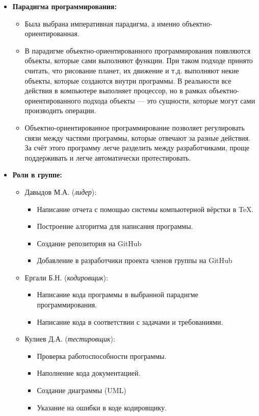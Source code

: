 \documentclass[14pt, oneside]{altsu-report}
\begin{document}
\begin{itemize}
    \item \textbf{Парадигма программирования:}
    \begin{itemize}
     \item Была выбрана императивная парадигма, а именно объектно-ориентированная.
     \item В парадигме объектно-ориентированного программирования появляются объекты, которые сами выполняют функции. При таком подходе принято считать, что рисование планет, их движение и т.д. выполняют некие объекты, которые создаются внутри программы. В реальности все действия в компьютере выполняет процессор, но в рамках объектно-ориентированного подхода объекты — это сущности, которые могут сами производить операции.
     \item Объектно-ориентированное программирование позволяет регулировать связи между частями программы, которые отвечают за разные действия. За счёт этого программу легче разделить между разработчиками, проще поддерживать и легче автоматически протестировать.
    \end{itemize}
    \item \textbf{Роли в группе:}
    \begin{itemize}
        \item Давыдов М.А. (\textit{лидер}):
            \begin{itemize}
                \item Написание отчета с помощью системы компьютерной вёрстки в \TeX.
                \item Построение алгоритма для написания программы.
                \item Создание репозитория на GitHub
                \item Добавление в разработчики проекта членов группы на GitHub
            \end{itemize}
        \item Ергали Б.Н. (\textit{кодировщик}):
            \begin{itemize}
                \item Написание кода программы в выбранной парадигме программирования.
                \item Написание кода в соответствии с задачами и требованиями.
            \end{itemize}
        \item Кулиев Д.А. (\textit{тестировщик}):
            \begin{itemize}
                \item Проверка работоспособности программы.
                \item Наполнение кода документацией.
                \item Создание диаграммы (UML)
                \item Указание на ошибки в коде кодировщику.
            \end{itemize}
        \end{itemize}
\end{itemize}
\end{document}
